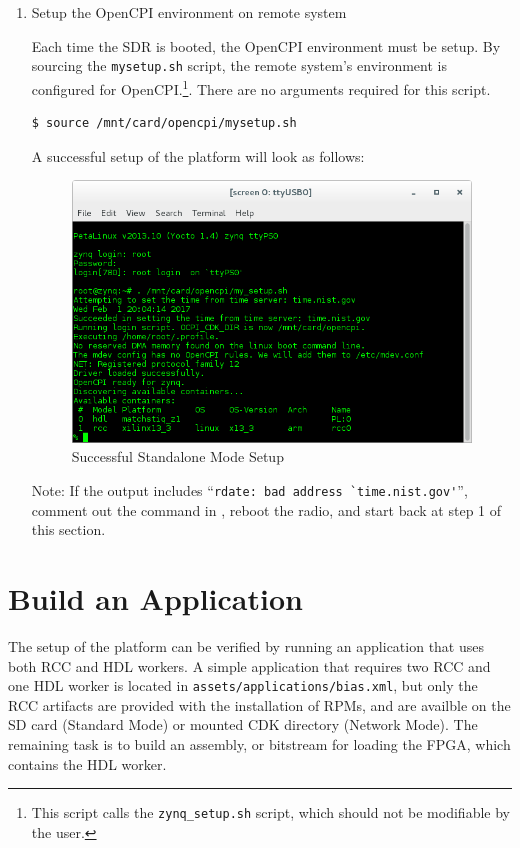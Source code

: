 \begin{enumerate}
\item Setup the OpenCPI environment on remote system

Each time the SDR is booted, the OpenCPI environment must be setup. By sourcing the \texttt{mysetup.sh} script, the remote system's environment is configured for OpenCPI.\footnote{This script calls the \texttt{zynq\_setup.sh} script, which should not be modifiable by the user.}. There are no arguments required for this script.
\begin{verbatim}
$ source /mnt/card/opencpi/mysetup.sh
\end{verbatim} \medskip

\noindent A successful setup of the platform will look as follows:
\begin{figure}[H]
	\centerline{\includegraphics[scale=0.5]{Matchstiq_Z1_setup}}
	\caption{Successful Standalone Mode Setup}
	\label{fig:standalonesetup}
\end{figure} \medskip

Note: If the output includes ``\verb+rdate: bad address `time.nist.gov'+'', comment out the  command in , reboot the radio, and start back at step 1 of this section.

\end{enumerate}

\pagebreak
\section{Build an Application}
\begin{flushleft}
The setup of the platform can be verified by running an application that uses both RCC and HDL workers. A simple application that requires two RCC and one HDL worker is located in \texttt{assets/applications/bias.xml}, but only the RCC artifacts are provided with the installation of RPMs, and are availble on the SD card (Standard Mode) or mounted CDK directory (Network Mode). The remaining task is to build an assembly, or bitstream for loading the FPGA, which contains the HDL worker.
\end{flushleft}

